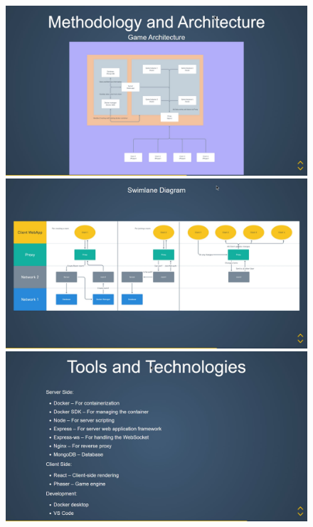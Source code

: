 \documentclass[oneside,12pt]{Classes/VTU}
\begin{document}
	\pagebreak
	\begin{figure}[ht!]
		\centering
		\includegraphics[scale=0.22]{s7.jpg}
		\includegraphics[scale=0.22]{s8.jpg}
		\includegraphics[scale=0.22]{s9.jpg}
	\end{figure}
	\pagebreak
\end{document}
